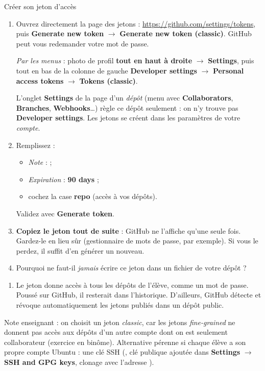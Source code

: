 \documentclass[11pt,a4paper]{article}
\newcommand{\reponse}[1]{}
\newcommand{\reponse}[1]{\par\smallskip{\color{gray!70}%
    \foreach \n in {1,...,#1}{\noindent\mbox{}\dotfill\par\vspace{2.5mm}}}}
\newcommand{\cmd}[1]{\texttt{\textcolor{ciel!70!black}{\detokenize{#1}}}}
\newcommand{\gh}[1]{\textsf{\textbf{#1}}}
\begin{document}
\begin{exercice}{Créer son jeton d'accès}
\begin{enumerate}
  \item Ouvrez directement la page des jetons : \url{https://github.com/settings/tokens}, puis
  \gh{Generate new token} $\rightarrow$ \gh{Generate new token (classic)}. GitHub peut vous redemander votre mot de passe.

  \emph{Par les menus} : photo de profil \textbf{tout en haut à droite} $\rightarrow$ \gh{Settings}, puis tout en bas
  de la colonne de gauche \gh{Developer settings} $\rightarrow$ \gh{Personal access tokens} $\rightarrow$
  \gh{Tokens (classic)}.
  \begin{attention}
  L'onglet \gh{Settings} de la page d'un \emph{dépôt} (menu avec \gh{Collaborators}, \gh{Branches}, \gh{Webhooks}\ldots)
  règle ce dépôt seulement : on n'y trouve pas \gh{Developer settings}. Les jetons se créent dans les paramètres
  de votre \emph{compte}.
  \end{attention}
  \item Remplissez :
  \begin{itemize}
    \item \emph{Note} : \cmd{tp-ciel} ;
    \item \emph{Expiration} : \gh{90 days} ;
    \item cochez la case \gh{repo} (accès à vos dépôts).
  \end{itemize}
  Validez avec \gh{Generate token}.
  \item \textbf{Copiez le jeton tout de suite} : GitHub ne l'affiche qu'une seule fois. Gardez-le en lieu sûr
  (gestionnaire de mots de passe, par exemple). Si vous le perdez, il suffit d'en générer un nouveau.
  \item Pourquoi ne faut-il \emph{jamais} écrire ce jeton dans un fichier de votre dépôt ? \reponse{2}
\end{enumerate}
\begin{correction}
\begin{enumerate}
  \item[4.] Le jeton donne accès à tous les dépôts de l'élève, comme un mot de passe. Poussé sur GitHub, il resterait
  dans l'historique. D'ailleurs, GitHub détecte et révoque automatiquement les jetons publiés dans un dépôt public.
\end{enumerate}
Note enseignant : on choisit un jeton \emph{classic}, car les jetons \emph{fine-grained} ne donnent pas accès aux
dépôts d'un autre compte dont on est seulement collaborateur (exercice en binôme). Alternative pérenne si chaque élève
a son propre compte Ubuntu : une clé SSH (\cmd{ssh-keygen}, clé publique ajoutée dans \gh{Settings}
$\rightarrow$ \gh{SSH and GPG keys}, clonage avec l'adresse \cmd{git@github.com:...}).
\end{correction}
\end{exercice}
\end{document}

